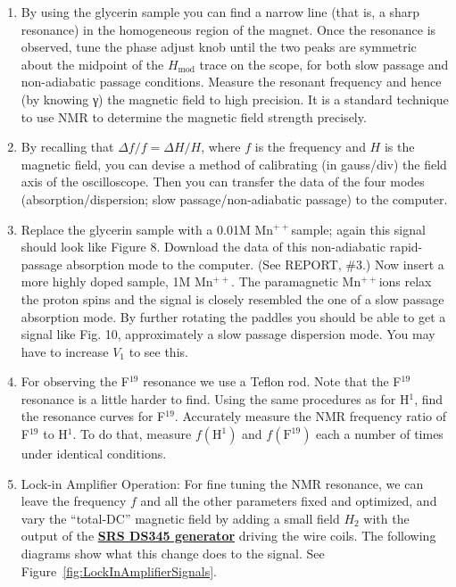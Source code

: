 \documentclass{../lab}
\begin{document}
\begin{enumerate}
    \item By using the glycerin sample you can find a narrow line (that is, a sharp resonance) in the homogeneous region of the magnet. Once the resonance is observed, tune the phase adjust knob until the two peaks are symmetric about the midpoint of the $H_\text{mod}$ trace on the scope, for both slow passage and non-adiabatic passage conditions. Measure the resonant frequency and hence (by knowing γ) the magnetic field to high precision. It is a standard technique to use NMR to determine the magnetic field strength precisely.

    \item By recalling that $\Delta f / f = \Delta H / H$, where $f$ is the frequency and $H$ is the magnetic field, you can devise a method of calibrating (in gauss/div) the field axis of the oscilloscope. Then you can transfer the data of the four modes (absorption/dispersion; slow passage/non-adiabatic passage) to the computer.
    
    \item Replace the glycerin sample with a 0.01M Mn$^{++}$sample; again this signal should look like Figure 8. Download the data of this non-adiabatic rapid-passage absorption mode to the computer. (See REPORT, \#3.) Now insert a more highly doped sample, 1M Mn$^{++}$. The paramagnetic Mn$^{++}$ions relax the proton spins and the signal is closely resembled the one of a slow passage absorption mode. By further rotating the paddles you should be able to get a signal like Fig. 10, approximately a slow passage dispersion mode. You may have to increase $V_1$ to see this.
    
    \item For observing the F$^{19}$ resonance we use a Teflon rod. Note that the F$^{19}$ resonance is a little harder to find. Using the same procedures as for H$^1$, find the resonance curves for F$^{19}$. Accurately measure the NMR frequency ratio of F$^{19}$ to H$^1$. To do that, measure $f(\text{H}^1)$ and $f(\text{F}^{19})$ each a number of times under identical conditions.
    
    \item Lock-in Amplifier Operation: For fine tuning the NMR resonance, we can leave the frequency $f$ and all the other parameters fixed and optimized, and vary the ``total-DC'' magnetic field by adding a small field $H_2$ with the output of the \href{https://youtu.be/PrM8DHFOFS0}{\textbf{SRS DS345 generator}} driving the wire coils. The following diagrams show what this change does to the signal. See Figure~\ref{fig:LockInAmplifierSignals}.
\end{enumerate}
\end{document}
